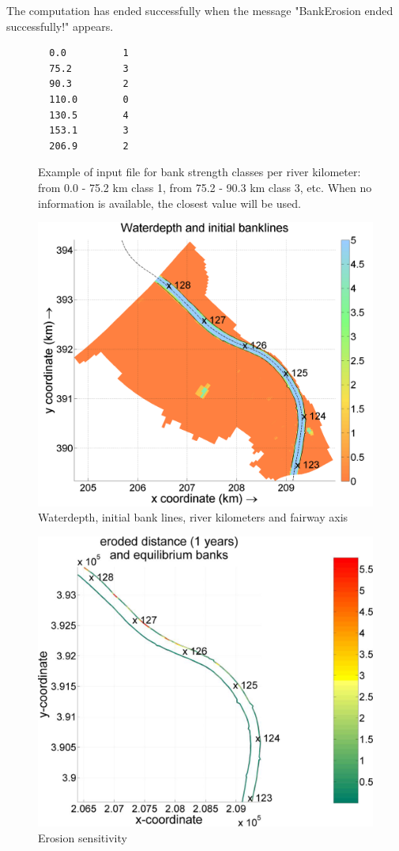 The computation has ended successfully when the message "BankErosion ended successfully!" appears.

\begin{figure}
\begin{Verbatim}
  0.0          1
  75.2         3
  90.3         2
  110.0        0
  130.5        4
  153.1        3
  206.9        2
\end{Verbatim}
\caption{Example of input file for bank strength classes per river kilometer: from 0.0 - 75.2 km class 1, from 75.2 - 90.3 km class 3, etc.
When no information is available, the closest value will be used.}
\label{Fig2.3}
\end{figure}

\begin{figure}
\includegraphics[width=\textwidth]{figures/Fig2-4.png}
\caption{Waterdepth, initial bank lines, river kilometers and fairway axis}
\label{Fig2.4}
\end{figure}

\begin{figure}
\includegraphics[width=\textwidth]{figures/Fig2-5.png}
\caption{Erosion sensitivity}
\label{Fig2.5}
\end{figure}

